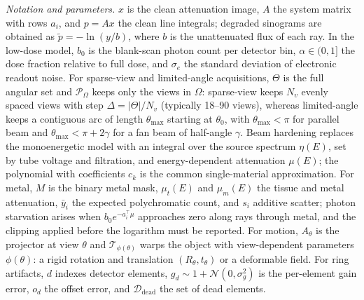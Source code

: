 \documentclass{article}
\begin{document}
\begin{table}[htbp]
\vspace{6pt}
\begin{minipage}{\linewidth}
\footnotesize
\textit{Notation and parameters.}
$x$ is the clean attenuation image, $A$ the system matrix with rows $a_i$, and $p = Ax$ the clean line integrals;
degraded sinograms are obtained as $\tilde p = -\ln(y/b)$, where $b$ is the unattenuated flux of each ray.
In the low-dose model, $b_0$ is the blank-scan photon count per detector bin, $\alpha \in (0,1]$ the dose fraction
relative to full dose, and $\sigma_e$ the standard deviation of electronic readout noise.
For sparse-view and limited-angle acquisitions, $\Theta$ is the full angular set and $\mathcal{P}_\Omega$ keeps only
the views in $\Omega$: sparse-view keeps $N_v$ evenly spaced views with step $\Delta = |\Theta|/N_v$ (typically 18--90 views),
whereas limited-angle keeps a contiguous arc of length $\theta_{\max}$ starting at $\theta_0$, with
$\theta_{\max} < \pi$ for parallel beam and $\theta_{\max} < \pi + 2\gamma$ for a fan beam of half-angle $\gamma$.
Beam hardening replaces the monoenergetic model with an integral over the source spectrum $\eta(E)$, set by tube
voltage and filtration, and energy-dependent attenuation $\mu(E)$; the polynomial with coefficients $c_k$ is the
common single-material approximation.
For metal, $M$ is the binary metal mask, $\mu_t(E)$ and $\mu_m(E)$ the tissue and metal attenuation, $\bar y_i$ the expected polychromatic count, and $s_i$ additive
scatter; photon starvation arises when $b_0 e^{-a_i^\top\mu}$ approaches zero along rays through metal, and the
clipping applied before the logarithm must be reported.
For motion, $A_\theta$ is the projector at view $\theta$ and $\mathcal{T}_{\phi(\theta)}$ warps the object with
view-dependent parameters $\phi(\theta)$: a rigid rotation and translation $(R_\theta, t_\theta)$ or a deformable field.
For ring artifacts, $d$ indexes detector elements, $g_d \sim 1 + \mathcal{N}(0,\sigma_g^2)$ is the per-element gain
error, $o_d$ the offset error, and $\mathcal{D}_{\text{dead}}$ the set of dead elements.
\end{minipage}
\end{table}
\end{document}

